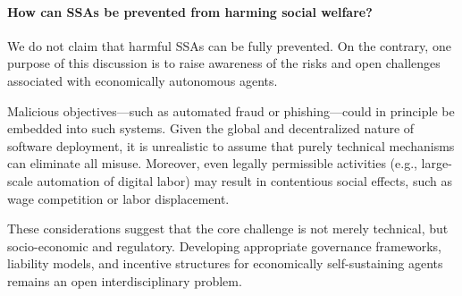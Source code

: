 
\paragraph{How can SSAs be prevented from harming social welfare?}
We do not claim that harmful SSAs can be fully prevented. On the contrary, one
purpose of this discussion is to raise awareness of the risks and open
challenges associated with economically autonomous agents.

Malicious objectives—such as automated fraud or phishing—could in principle be
embedded into such systems. Given the global and decentralized nature of
software deployment, it is unrealistic to assume that purely technical
mechanisms can eliminate all misuse. Moreover, even legally permissible
activities (e.g., large-scale automation of digital labor) may result in 
contentious social effects, such as wage competition or labor displacement.

These considerations suggest that the core challenge is not merely technical, 
but socio-economic and regulatory. Developing appropriate governance
frameworks, liability models, and incentive structures for economically
self-sustaining agents remains an open interdisciplinary problem.